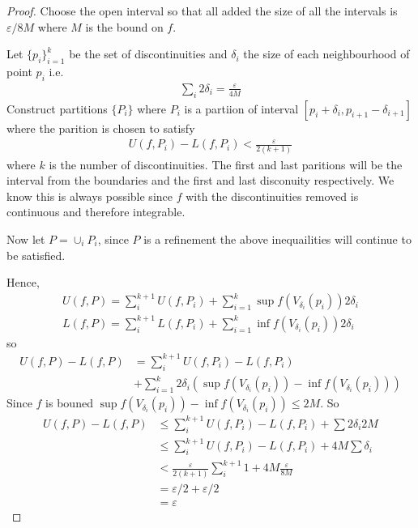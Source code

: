 \begin{proof}
    Choose the open interval so that all added the size of all the 
    intervals is $\varepsilon/8M$ where $M$ is the bound on $f$.

    Let $\{p_i\}_{i=1}^k$ be the set of discontinuities and 
    $\delta_i$ the size of each neighbourhood of point $p_i$ i.e.
    \begin{align*}
        \sum_i 2\delta_i = \frac{\varepsilon}{4M}
    \end{align*}
    Construct partitions $\{P_i\}$ where $P_i$ is a partiion 
    of interval $[p_i+\delta_i, p_{i+1}-\delta_{i+1}]$ where the 
    parition is chosen to satisfy 
    \begin{align*}
        U(f, P_i) - L(f,P_i) < \frac{\varepsilon}{2(k+1)}
    \end{align*}
    where $k$ is the number of discontinuities. The first and last 
    paritions will be the interval from the boundaries and the 
    first and last disconuity respectively.
    We know this is always possible since $f$ with the discontinuities 
    removed is continuous and therefore integrable.

    Now let $P = \cup_i P_i$, since $P$ is a refinement the above 
    inequailities will continue to be satisfied.
    
    Hence, 
    \begin{gather*}
        U(f, P) = \sum_i^{k+1} U(f, P_i) + \sum_{i=1}^k \sup f(V_{\delta_i}(p_i))2\delta_i \\
        L(f, P) = \sum_i^{k+1} L(f, P_i) + \sum_{i=1}^k \inf f(V_{\delta_i}(p_i))2\delta_i
    \end{gather*}
    so 
    \begin{align*}
        U(f, P) -  L(f, P) &= \sum_i^{k+1} U(f, P_i)  - L(f, P_i)  \\ 
        &+ \sum_{i=1}^k 2\delta_i (\sup f(V_{\delta_i}(p_i)) - \inf f(V_{\delta_i}(p_i)))
    \end{align*}
    Since $f$ is bouned $\sup f(V_{\delta_i}(p_i)) - \inf f(V_{\delta_i}(p_i)) \leq 2M$.
    So 
    \begin{align*}
        U(f, P) -  L(f, P) &\leq \sum_i^{k+1} U(f, P_i)  - L(f, P_i) + \sum 2\delta_i 2M \\
        &\leq \sum_i^{k+1} U(f, P_i)  - L(f, P_i) + 4M \sum \delta_i \\
        &< \frac{\varepsilon}{2(k+1)} \sum_i^{k+1} 1 + 4M \frac{\varepsilon}{8M} \\
        &= \varepsilon/2 + \varepsilon/2 \\
        &= \varepsilon 
    \end{align*}
\end{proof}

